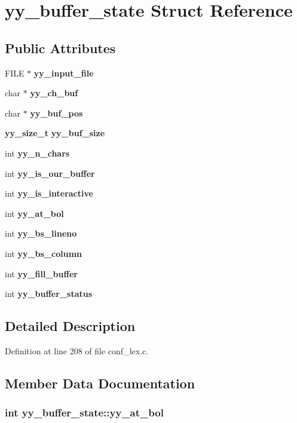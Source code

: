 \section{yy\_\-buffer\_\-state Struct Reference}
\label{structyy__buffer__state}
\subsection*{Public Attributes}
\begin{DoxyCompactItemize}
\item 
FILE $\ast$ {\bf yy\_\-input\_\-file}
\item 
char $\ast$ {\bf yy\_\-ch\_\-buf}
\item 
char $\ast$ {\bf yy\_\-buf\_\-pos}
\item 
{\bf yy\_\-size\_\-t} {\bf yy\_\-buf\_\-size}
\item 
int {\bf yy\_\-n\_\-chars}
\item 
int {\bf yy\_\-is\_\-our\_\-buffer}
\item 
int {\bf yy\_\-is\_\-interactive}
\item 
int {\bf yy\_\-at\_\-bol}
\item 
int {\bf yy\_\-bs\_\-lineno}
\item 
int {\bf yy\_\-bs\_\-column}
\item 
int {\bf yy\_\-fill\_\-buffer}
\item 
int {\bf yy\_\-buffer\_\-status}
\end{DoxyCompactItemize}


\subsection{Detailed Description}


Definition at line 208 of file conf\_\-lex.c.

\subsection{Member Data Documentation}
\subsubsection[{yy\_\-at\_\-bol}]{\setlength{\rightskip}{0pt plus 5cm}int {\bf yy\_\-buffer\_\-state::yy\_\-at\_\-bol}}\label{structyy__buffer__state_a9d60c60af6e1a6f69de16871fd64f85f}



